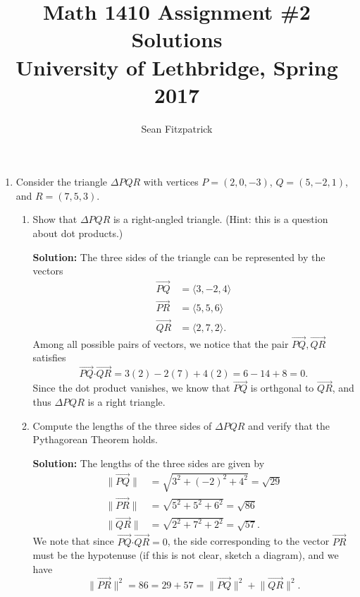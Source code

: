 \documentclass[letterpaper,12pt]{article}
\title{Math 1410 Assignment \#2 Solutions\\University of Lethbridge, Spring 2017}
\author{Sean Fitzpatrick}
\newcommand{\len}[1]{\lVert #1\rVert}
\newcommand{\dotp}{\boldsymbol{\cdot}}
\begin{document}
 \maketitle

\begin{enumerate}
\item Consider the triangle $\Delta PQR$ with vertices $P=(2,0,-3)$, $Q=(5,-2,1)$, and $R=(7,5,3)$.
\begin{enumerate}
 \item Show that $\Delta PQR$ is a right-angled triangle. (Hint: this is a question about dot products.)

\bigskip

{\bf Solution:} The three sides of the triangle can be represented by the vectors
\begin{align*}
 \overrightarrow{PQ} &= \langle 3,-2,4\rangle\\
 \overrightarrow{PR} & = \langle 5,5,6\rangle\\
 \overrightarrow{QR} & = \langle 2,7,2\rangle.
\end{align*}
Among all possible pairs of vectors, we notice that the pair $\overrightarrow{PQ},\overrightarrow{QR}$ satisfies
\[
 \overrightarrow{PQ}\dotp\overrightarrow{QR} = 3(2)-2(7)+4(2) = 6-14+8=0.
\]
Since the dot product vanishes, we know that $\overrightarrow{PQ}$ is orthgonal to $\overrightarrow{QR}$, and thus $\Delta PQR$ is a right triangle.

\medskip

 \item Compute the lengths of the three sides of $\Delta PQR$ and verify that the Pythagorean Theorem holds.

\bigskip

{\bf Solution:} The lengths of the three sides are given by 
\begin{align*}
 \len{\overrightarrow{PQ}} & = \sqrt{3^2+(-2)^2+4^2} = \sqrt{29}\\
 \len{\overrightarrow{PR}} & = \sqrt{5^2+5^2+6^2} = \sqrt{86}\\
 \len{\overrightarrow{QR}} & = \sqrt{2^2+7^2+2^2} = \sqrt{57}.
\end{align*}
We note that since $\overrightarrow{PQ}\dotp\overrightarrow{QR}=0$, the side corresponding to the vector $\overrightarrow{PR}$ must be the hypotenuse (if this is not clear, sketch a diagram), and we have
\[
 \len{\overrightarrow{PR}}^2 = 86 = 29+57 = \len{\overrightarrow{PQ}}^2+\len{\overrightarrow{QR}}^2.
\]

\medskip


\end{enumerate}
\end{enumerate}
\end{document}
